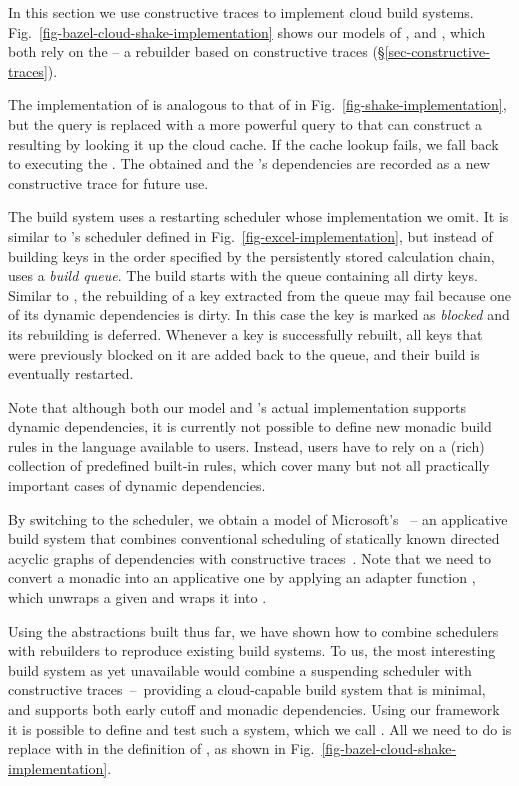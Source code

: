 In this section we use constructive traces to implement cloud build systems.
Fig.~\ref{fig-bazel-cloud-shake-implementation} shows our models of \Bazel,
\CloudBuild and \Cloud \Shake, which both rely on the  -- a
rebuilder based on constructive traces (\S\ref{sec-constructive-traces}).

The implementation of  is analogous to that of 
in Fig.~\ref{fig-shake-implementation}, but the  query is replaced
with a more powerful query to  that can construct a resulting
 by looking it up the cloud cache. If the cache lookup fails, we
fall back to executing the . The obtained  and the
's dependencies are recorded as a new constructive trace for future
use.

The \Bazel build system uses a restarting scheduler whose implementation we
omit. It is similar to \Excel's  scheduler defined in
Fig.~\ref{fig-excel-implementation}, but instead of building keys in the order
specified by the persistently stored calculation chain, \Bazel uses a
\emph{build queue}. The build starts with the queue containing all dirty keys.
Similar to \Excel, the rebuilding of a key extracted from the queue may fail
because one of its dynamic dependencies is dirty. In this case the key is marked
as \emph{blocked} and its rebuilding is deferred. Whenever a key is successfully
rebuilt, all keys that were previously blocked on it are added back to the
queue, and their build is eventually restarted.

Note that although both our model and \Bazel's actual implementation supports
dynamic dependencies, it is currently not possible to define new monadic build
rules in the language available to users. Instead, users have to rely on a
(rich) collection of predefined built-in rules, which cover many but not all
practically important cases of dynamic dependencies.

By switching to the  scheduler, we obtain a model of
Microsoft's \CloudBuild~-- an applicative build system that combines
conventional scheduling of statically known directed acyclic graphs of
dependencies with constructive traces~\cite{esfahani2016cloudbuild}. Note that
we need to convert a monadic  into an applicative one by
applying an adapter function , which unwraps a given
 and wraps it into .

Using the abstractions built thus far, we have shown how to combine schedulers
with rebuilders to reproduce existing build systems. To us, the most interesting
build system as yet unavailable would combine a suspending scheduler with
constructive traces~--~providing a cloud-capable build system that is minimal,
and supports both early cutoff and monadic dependencies. Using our framework it
is possible to define and test such a system, which we call \Cloud \Shake. All
we need to do is replace  with  in the definition
of \Bazel, as shown in Fig.~\ref{fig-bazel-cloud-shake-implementation}.

